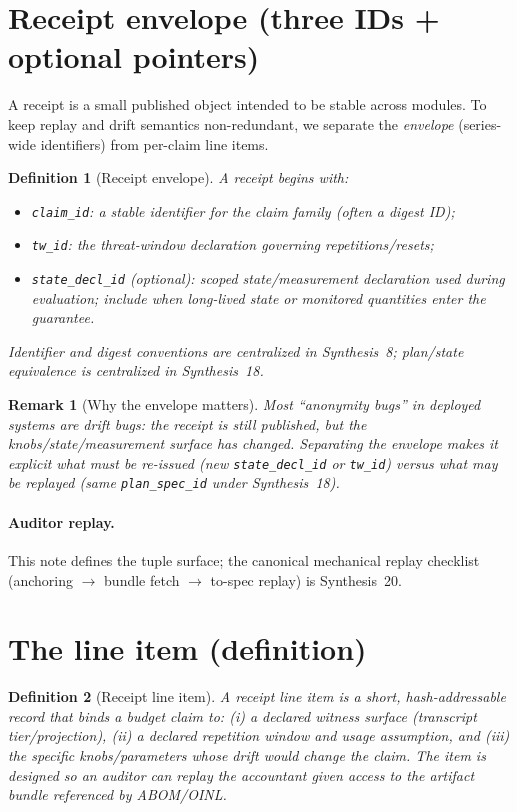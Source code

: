 \documentclass[11pt]{article}
\newtheorem{definition}{Definition}
\newtheorem{remark}{Remark}
\begin{document}
\section{Receipt envelope (three IDs + optional pointers)}
A receipt is a small published object intended to be stable across modules.
To keep replay and drift semantics non-redundant, we separate the \emph{envelope} (series-wide identifiers) from per-claim line items.

\begin{definition}[Receipt envelope]
A receipt begins with:
\begin{itemize}[leftmargin=*]
\item \texttt{claim\_id}: a stable identifier for the claim family (often a digest ID);
\item \texttt{tw\_id}: the threat-window declaration governing repetitions/resets;
\item \texttt{state\_decl\_id} (optional): scoped state/measurement declaration used during evaluation; include when long-lived state or monitored quantities enter the guarantee.
\end{itemize}
Identifier and digest conventions are centralized in Synthesis~8; plan/state equivalence is centralized in Synthesis~18.\cite{series:notation,series:planstateequiv}
\end{definition}

\begin{remark}[Why the envelope matters]
Most ``anonymity bugs'' in deployed systems are drift bugs: the receipt is still published, but the knobs/state/measurement surface has changed.
Separating the envelope makes it explicit what must be re-issued (new \texttt{state\_decl\_id} or \texttt{tw\_id}) versus what may be replayed (same \texttt{plan\_spec\_id} under Synthesis~18).
\end{remark}

\paragraph{Auditor replay.}
This note defines the tuple surface; the canonical mechanical replay checklist (anchoring $\rightarrow$ bundle fetch $\rightarrow$ to-spec replay) is Synthesis~20.\cite{series:auditorreplay}

\section{The line item (definition)}
\begin{definition}[Receipt line item]
A \emph{receipt line item} is a short, hash-addressable record that binds a \emph{budget claim} to:
(i) a declared witness surface (transcript tier/projection),
(ii) a declared repetition window and usage assumption, and
(iii) the specific knobs/parameters whose drift would change the claim.
The item is designed so an auditor can replay the accountant given access to the artifact bundle referenced by ABOM/OINL.
\end{definition}
\end{document}
